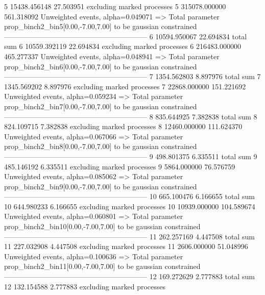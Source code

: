 5          15438.456148    27.503951       excluding marked processes    
5          315078.000000   561.318092      Unweighted events, alpha=0.049071
  => Total parameter prop_binch2_bin5[0.00,-7.00,7.00] to be gaussian constrained
------------------------------------------------------------
6          10594.950067    22.694834       total sum                     
6          10559.392119    22.694834       excluding marked processes    
6          216483.000000   465.277337      Unweighted events, alpha=0.048941
  => Total parameter prop_binch2_bin6[0.00,-7.00,7.00] to be gaussian constrained
------------------------------------------------------------
7          1354.562803     8.897976        total sum                     
7          1345.569202     8.897976        excluding marked processes    
7          22868.000000    151.221692      Unweighted events, alpha=0.059234
  => Total parameter prop_binch2_bin7[0.00,-7.00,7.00] to be gaussian constrained
------------------------------------------------------------
8          835.644925      7.382838        total sum                     
8          824.109715      7.382838        excluding marked processes    
8          12460.000000    111.624370      Unweighted events, alpha=0.067066
  => Total parameter prop_binch2_bin8[0.00,-7.00,7.00] to be gaussian constrained
------------------------------------------------------------
9          498.801375      6.335511        total sum                     
9          485.146192      6.335511        excluding marked processes    
9          5864.000000     76.576759       Unweighted events, alpha=0.085062
  => Total parameter prop_binch2_bin9[0.00,-7.00,7.00] to be gaussian constrained
------------------------------------------------------------
10         665.100476      6.166655        total sum                     
10         644.980233      6.166655        excluding marked processes    
10         10939.000000    104.589674      Unweighted events, alpha=0.060801
  => Total parameter prop_binch2_bin10[0.00,-7.00,7.00] to be gaussian constrained
------------------------------------------------------------
11         262.257169      4.447508        total sum                     
11         227.032908      4.447508        excluding marked processes    
11         2606.000000     51.048996       Unweighted events, alpha=0.100636
  => Total parameter prop_binch2_bin11[0.00,-7.00,7.00] to be gaussian constrained
------------------------------------------------------------
12         169.272629      2.777883        total sum                     
12         132.154588      2.777883        excluding marked processes    
